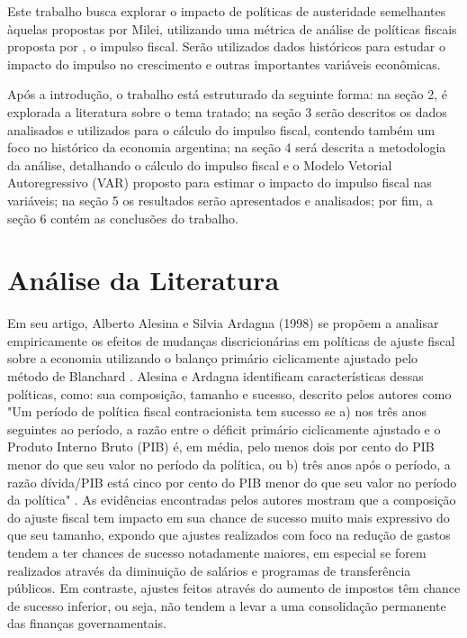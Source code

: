 \documentclass[a4paper, 12pt, openany, oneside, brazil]{abntex2}
\begin{document}
Este trabalho busca explorar o impacto de políticas de austeridade semelhantes àquelas propostas por Milei, utilizando uma métrica de análise de políticas fiscais proposta por \cite{Blanchard1990}, o impulso fiscal. Serão utilizados dados históricos para estudar o impacto do impulso no crescimento e outras importantes variáveis econômicas.

Após a introdução, o trabalho está estruturado da seguinte forma: na seção 2, é explorada a literatura sobre o tema tratado; na seção 3 serão descritos os dados analisados e utilizados para o cálculo do impulso fiscal, contendo também um foco no histórico da economia argentina; na seção 4 será descrita a metodologia da análise, detalhando o cálculo do impulso fiscal e o Modelo Vetorial Autoregressivo (VAR) proposto para estimar o impacto do impulso fiscal nas variáveis; na seção 5 os resultados serão apresentados e analisados; por fim, a seção 6 contém as conclusões do trabalho. 

\chapter{Análise da Literatura}

Em seu artigo, Alberto Alesina e Silvia Ardagna (1998) se propõem a analisar empiricamente os efeitos de mudanças discricionárias em políticas de ajuste fiscal sobre a economia utilizando o balanço primário ciclicamente ajustado pelo método de Blanchard \cite{Alesina1998}. Alesina e Ardagna identificam características dessas políticas, como: sua composição, tamanho e sucesso, descrito pelos autores como "Um período de política fiscal contracionista tem sucesso se a) nos três anos seguintes ao período, a razão entre o déficit primário ciclicamente ajustado e o Produto Interno Bruto (PIB) é, em média, pelo menos dois por cento do PIB menor do que seu valor no período da política, ou b) três anos após o período, a razão dívida/PIB está cinco por cento do PIB menor do que seu valor no período da política" \cite{Alesina1998}. As evidências encontradas pelos autores mostram que a composição do ajuste fiscal tem impacto em sua chance de sucesso muito mais expressivo do que seu tamanho, expondo que ajustes realizados com foco na redução de gastos tendem a ter chances de sucesso notadamente maiores, em especial se forem realizados através da diminuição de salários e programas de transferência públicos. Em contraste, ajustes feitos através do aumento de impostos têm chance de sucesso inferior, ou seja, não tendem a levar a uma consolidação permanente das finanças governamentais.
\end{document}
